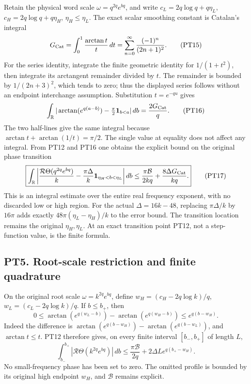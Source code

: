 \documentclass[10pt]{article}
\begin{document}
Retain the physical word scale \(\omega=q^{2q}e^{bq}\), and write \(c_L=2q\log q+q\eta_L\), \(c_H=2q\log q+q\eta_H\), \(\eta_H\le\eta_L\). The exact scalar smoothing constant is Catalan's integral \[
 G_{\rm Cat}=\int_0^1\frac{\arctan t}{t}\,dt
 =\sum_{n=0}^{\infty}\frac{(-1)^n}{(2n+1)^2}.
 \tag{PT15}
\] For the series identity, integrate the finite geometric identity for \(1/(1+t^2)\), then integrate its arctangent remainder divided by \(t\). The remainder is bounded by \(1/(2n+3)^2\), which tends to zero; thus the displayed series follows without an endpoint interchange assumption. Substitution \(t=e^{-qu}\) gives \[
 \int_{\mathbb R}|\arctan(e^{q(a-b)})-\tfrac\pi2\mathbf1_{b<a}|\,db
 =\frac{2G_{\rm Cat}}q.
 \tag{PT16}
\] The two half-lines give the same integral because \(\arctan t+\arctan(1/t)=\pi/2\). The single value at equality does not affect any integral. From PT12 and PT16 one obtains the explicit bound on the original phase transition \[
 \boxed{
 \int_{\mathbb R}\left|\frac{\mathcal R\Theta(q^{2q}e^{bq})}{k}
 -\frac{\pi\Delta}{k}\mathbf1_{\eta_H<b<\eta_L}\right|db
 \le\frac{\pi\mathcal B}{2kq}+
       \frac{8\Delta G_{\rm Cat}}{kq}.}
 \tag{PT17}
\] This is an integral estimate over the entire real frequency exponent, with no discarded low or high region. For the actual \(\Delta=16k-48\), replacing \(\pi\Delta/k\) by \(16\pi\) adds exactly \(48\pi(\eta_L-\eta_H)/k\) to the error bound. The transition location remains the original \(\eta_H,\eta_L\). At an exact transition point PT12, not a step-function value, is the finite formula.

\subsection{PT5. Root-scale restriction and finite quadrature}\label{pt5.-root-scale-restriction-and-finite-quadrature}

On the original root scale \(\omega=k^{2q}e^{bq}\), define \(w_H=(c_H-2q\log k)/q\), \(w_L=(c_L-2q\log k)/q\). If \(b\le b_+\), then \[
 0\le \arctan(e^{q(w_L-b)})-\arctan(e^{q(w_H-b)})
 \le e^{q(b-w_H)}.
 \tag{PT18}
\] Indeed the difference is \(\arctan(e^{q(b-w_H)})-\arctan(e^{q(b-w_L)})\), and \(\arctan t\le t\). PT12 therefore gives, on every finite interval \([b_-,b_+]\) of length \(L\), \[
 \int_{b_-}^{b_+}|\mathcal R\Theta(k^{2q}e^{bq})|\,db
 \le\frac{\pi\mathcal B}{2q}+2\Delta L e^{q(b_+-w_H)}.
 \tag{PT19}
\] No small-frequency phase has been set to zero. The omitted profile is bounded by its original high endpoint \(w_H\), and \(\mathcal B\) remains explicit.
\end{document}
